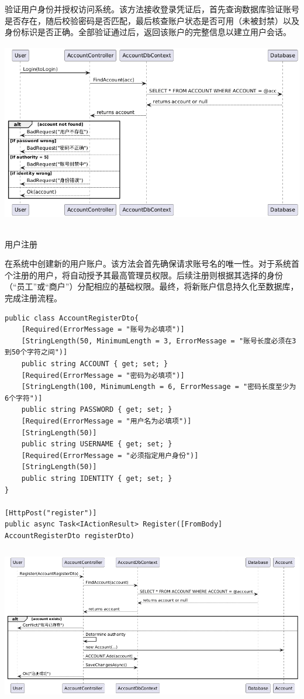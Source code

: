 \documentclass[]{article}
\begin{document}
验证用户身份并授权访问系统。该方法接收登录凭证后，首先查询数据库验证账号是否存在，随后校验密码是否匹配，最后核查账户状态是否可用（未被封禁）以及身份标识是否正确。全部验证通过后，返回该账户的完整信息以建立用户会话。\includegraphics[width=5.88681in,height=3.37778in]{media/media/image5.png}

用户注册

在系统中创建新的用户账户。该方法会首先确保请求账号名的唯一性。对于系统首个注册的用户，将自动授予其最高管理员权限。后续注册则根据其选择的身份（``员工''或``商户''）分配相应的基础权限。最终，将新账户信息持久化至数据库，完成注册流程。
\begin{verbatim}
public class AccountRegisterDto{
    [Required(ErrorMessage = "账号为必填项")]
    [StringLength(50, MinimumLength = 3, ErrorMessage = "账号长度必须在3到50个字符之间")]
    public string ACCOUNT { get; set; }
    [Required(ErrorMessage = "密码为必填项")]
    [StringLength(100, MinimumLength = 6, ErrorMessage = "密码长度至少为6个字符")]
    public string PASSWORD { get; set; }
    [Required(ErrorMessage = "用户名为必填项")]
    [StringLength(50)]
    public string USERNAME { get; set; }
    [Required(ErrorMessage = "必须指定用户身份")]
    [StringLength(50)]
    public string IDENTITY { get; set; }
}

[HttpPost("register")]
public async Task<IActionResult> Register([FromBody] AccountRegisterDto registerDto)
\end{verbatim}

\includegraphics[width=5.75347in,height=2.69097in]{media/media/image6.png}
\end{document}
